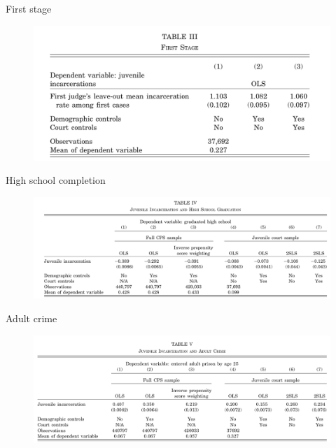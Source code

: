 \documentclass{beamer}
\begin{document}
\begin{frame}{First stage}
	
	\begin{figure}
	\includegraphics[scale=0.15]{./lecture_includes/firststage.png}
	\end{figure}
\end{frame}


\begin{frame}{High school completion}
	
	\begin{figure}
	\includegraphics[scale=0.15]{./lecture_includes/highschool.png}
	\end{figure}
\end{frame}


\begin{frame}{Adult crime}
	
	\begin{figure}
	\includegraphics[scale=0.2]{./lecture_includes/adult_crime.png}
	\end{figure}
\end{frame}
\end{document}
